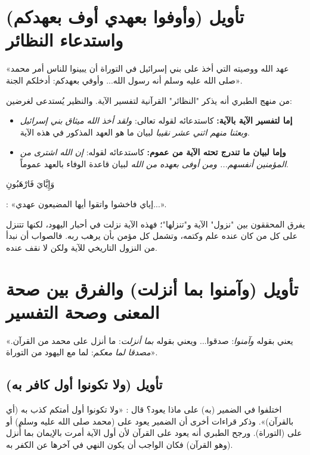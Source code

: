 \separator

\section{تأويل (وأوفوا بعهدي أوف بعهدكم) واستدعاء النظائر}
 «عهد الله ووصيته التي أخذ على بني إسرائيل في التوراة أن يبينوا للناس أمر محمد صلى الله عليه وسلم أنه رسول الله... وأوفي بعهدكم: أدخلكم الجنة».

\begin{fawaid}
من منهج الطبري أنه يذكر "النظائر" القرآنية لتفسير الآية. والنظير يُستدعى لغرضين:
\begin{itemize}
    \item \textbf{إما لتفسير الآية بالآية:} كاستدعائه لقوله تعالى: \textit{ولقد أخذ الله ميثاق بني إسرائيل وبعثنا منهم اثني عشر نقيبا} لبيان ما هو العهد المذكور في هذه الآية.
    \item \textbf{وإما لبيان ما تندرج تحته الآية من عموم:} كاستدعائه لقوله: \textit{إن الله اشترى من المؤمنين أنفسهم... ومن أوفى بعهده من الله} لبيان قاعدة الوفاء بالعهد عموماً.
\end{itemize}
\end{fawaid}

 \begin{ayah}وَإِيَّايَ فَارْهَبُونِ\end{ayah}: «إياي فاخشوا واتقوا أيها المضيعون عهدي...».

\begin{fawaid}
يفرق المحققون بين "نزول" الآية و"تنزلها"؛ فهذه الآية نزلت في أحبار اليهود، لكنها تتنزل على كل من كان عنده علم وكتمه، وتشمل كل مؤمن بأن يرهب ربه. فالصواب أن نبدأ من النزول التاريخي للآية ولكن لا نقف عنده.
\end{fawaid}

\separator

\section{تأويل (وآمنوا بما أنزلت) والفرق بين صحة المعنى وصحة التفسير}
 «يعني بقوله \textit{وآمنوا}: صدقوا... ويعني بقوله \textit{بما أنزلت}: ما أنزل على محمد من القرآن. \textit{مصدقا لما معكم}: لما مع اليهود من التوراة».

\subsection{تأويل (ولا تكونوا أول كافر به)}
اختلفوا في الضمير (به) على ماذا يعود؟ 
قال : «ولا تكونوا أول أمتكم كذب به (أي بالقرآن)». وذكر قراءات أخرى أن الضمير يعود على (محمد صلى الله عليه وسلم) أو على (التوراة). ورجح الطبري أنه يعود على القرآن لأن أول الآية أمرت بالإيمان بما أُنزل (وهو القرآن) فكان الواجب أن يكون النهي في آخرها عن الكفر به.

